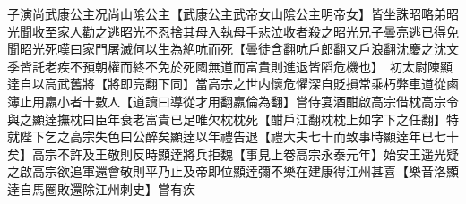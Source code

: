 子演尚武康公主况尚山隂公主【武康公主武帝女山隂公主明帝女】皆坐誅昭略弟昭光聞收至家人勸之逃昭光不忍捨其母入執母手悲泣收者殺之昭光兄子曇亮逃已得免聞昭光死嘆曰家門屠滅何以生為絶吭而死【曇徒含翻吭戶郎翻又戶浪翻沈慶之沈文季皆託老疾不預朝權而終不免於死國無道而富貴則進退皆䧟危機也】　初太尉陳顯逹自以高武舊將【將即亮翻下同】當高宗之世内懷危懼深自貶損常乘朽弊車道從鹵簿止用羸小者十數人【道讀曰導從才用翻羸倫為翻】嘗侍宴酒酣啟高宗借枕高宗令與之顯逹撫枕曰臣年衰老富貴已足唯欠枕枕死【酣戶江翻枕枕上如字下之任翻】特就陛下乞之高宗失色曰公醉矣顯逹以年禮告退【禮大夫七十而致事時顯逹年已七十矣】高宗不許及王敬則反時顯逹將兵拒魏【事見上卷高宗永泰元年】始安王遥光疑之啟高宗欲追軍還會敬則平乃止及帝即位顯逹彌不樂在建康得江州甚喜【樂音洛顯逹自馬圈敗還除江州刺史】嘗有疾